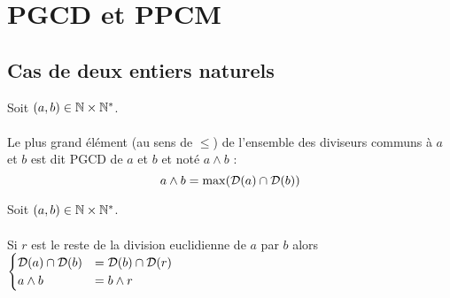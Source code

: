 \section{PGCD et PPCM}
\subsection{Cas de deux entiers naturels}
\begin{defi}
    Soit \((a, b) \in \mathbb{N} \times \mathbb{N}^*\).\\~\\
    Le plus grand élément (au sens de \(\leq\)) de l’ensemble des diviseurs communs à \(a\) et \(b\) est dit PGCD de \(a\) et \(b\) et noté \(a \wedge b\) :
    \[a \wedge b = \max (\mathcal{D}(a) \cap \mathcal{D}(b))\]
\end{defi}

\begin{prop}
    
    Soit \((a, b) \in \mathbb{N} \times \mathbb{N}^*\).\\~\\
    Si \(r\) est le reste de la division euclidienne de \(a\) par \(b\) alors \(\begin{cases}
        \mathcal{D}(a) \cap \mathcal{D}(b) &= \mathcal{D}(b) \cap \mathcal{D}(r) \\
        a\wedge b                            &= b\wedge r
    \end{cases}\)
\end{prop}

